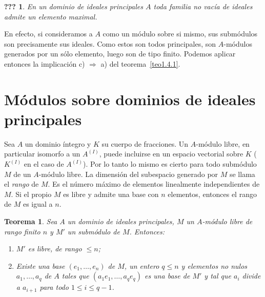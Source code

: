 \documentclass[bibtotoc,leqno,spanish]{amsbook}
\newcommand{\then}{\ensuremath{\Rightarrow}\xspace}
\numberwithin{equation}{section}
\theoremstyle{note}
\theoremstyle{note}
\newtheorem{theorem}{Teorema}
\newcommand{\namedname}{???}
\newtheorem*{namedthm}{\namedname}
\newenvironment{named}[1]%
	{\renewcommand{\namedname}{#1}%
	\begin{namedthm}}%
	{\end{namedthm}}
\theoremstyle{rem}
\numberwithin{theorem}{section}
\numberwithin{proposition}{section}
\numberwithin{definition}{section}
\numberwithin{lemma}{section}
\numberwithin{corollary}{section}
\numberwithin{example}{section}
\numberwithin{footnote}{section}%
\begin{document}
\begin{named}{Corolario del teorema 1}
En un dominio de ideales principales $A$ toda familia no vac\'ia
de ideales admite un elemento maximal.
\end{named}

En efecto, si consideramos a $A$ como un m\'odulo sobre si
mismo, sus subm\'odulos son precisamente sus ideales. Como estos
son todos principales, son $A$-m\'odulos generados por un
s\'olo elemento, luego son de tipo finito. Podemos aplicar
entonces la implicaci\'on c) \then a) del teorema~\ref{teo1.4.1}.

\section{M\'odulos sobre dominios de ideales principales}\label{sec1.5}

Sea $A$ un dominio \'integro y $K$ su cuerpo de fracciones. Un $A$-m\'odulo
libre, en particular isomorfo a un $A^{(I)}$, puede incluirse en
un espacio vectorial sobre $K$ ($K^{(I)}$ en el caso de $A^{(I)}$).
Por lo tanto lo mismo es cierto para todo subm\'odulo $M$ de un
$A$-m\'odulo libre. La dimensi\'on del subespacio generado por
$M$ se llama el {\em rango} de $M$. Es el n\'umero m\'aximo de
elementos linealmente independientes de $M$. Si el propio $M$ es libre
y admite una base con $n$ elementos, entonces el rango de $M$ es
igual a $n$.

\begin{theorem}\label{teo1.5.1}
Sea $A$ un dominio de ideales principales, $M$ un $A$-m\'odulo
libre de rango finito $n$ y $M'$ un subm\'odulo de $M$. Entonces:
\begin{enumerate}
\item $M'$ es libre, de rango $\leq n$;
\item Existe una base $(e_{1},\dots,e_{n})$ de $M$, un entero
$q\leq n$ y elementos no nulos $a_{1},\dots,a_{q}$ de $A$ tales que
$(a_{1}e_{1},\dots, a_{q}e_{q})$ es una base de $M'$ y tal que
$a_{i}$ divide a $a_{i+1}$ para todo $1\leq i\leq q-1$.
\end{enumerate}
\end{theorem}
\end{document}
